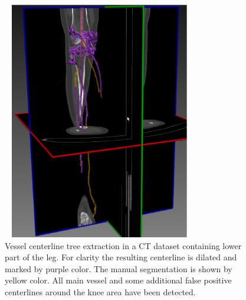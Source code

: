 \begin{enumerate}
\begin{figure}[!htbp]
\centering
\includegraphics[width=85mm,height=104mm]{figures/research/kristina_fibula.png}
\caption{\label{fig:Skeleton}
Vessel centerline tree extraction in a CT dataset containing lower part of the leg. For clarity the resulting centerline is dilated and marked by purple color.  The manual segmentation is shown by yellow color. All main vessel and some additional false positive centerlines around the knee area have been detected.} 
\end{figure}



\end{enumerate}
